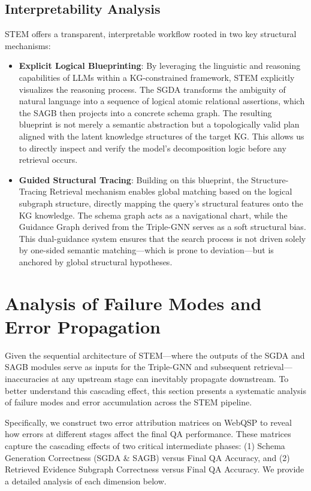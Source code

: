\documentclass[11pt]{article}
\begin{document}
\subsection{Interpretability Analysis}
STEM offers a transparent, interpretable workflow rooted in two key structural mechanisms:
\begin{itemize}
    \item \textbf{Explicit Logical Blueprinting}: By leveraging the linguistic and reasoning capabilities of LLMs within a KG-constrained framework, STEM explicitly visualizes the reasoning process. The SGDA transforms the ambiguity of natural language into a sequence of logical atomic relational assertions, which the SAGB then projects into a concrete schema graph. The resulting blueprint is not merely a semantic abstraction but a topologically valid plan aligned with the latent knowledge structures of the target KG. This allows us to directly inspect and verify the model's decomposition logic before any retrieval occurs. 
    \item \textbf{Guided Structural Tracing}: Building on this blueprint, the Structure-Tracing Retrieval mechanism enables global matching based on the logical subgraph structure, directly mapping the query's structural features onto the KG knowledge. The schema graph acts as a navigational chart, while the Guidance Graph derived from the Triple-GNN serves as a soft structural bias. This dual-guidance system ensures that the search process is not driven solely by one-sided semantic matching—which is prone to deviation—but is anchored by global structural hypotheses. 
\end{itemize}

\section{Analysis of Failure Modes and Error Propagation}
\label{sec:afmep}

Given the sequential architecture of STEM—where the outputs of the SGDA and SAGB modules serve as inputs for the Triple-GNN and subsequent retrieval—inaccuracies at any upstream stage can inevitably propagate downstream. To better understand this cascading effect, this section presents a systematic analysis of failure modes and error accumulation across the STEM pipeline. 

Specifically, we construct two error attribution matrices on WebQSP to reveal how errors at different stages affect the final QA performance. These matrices capture the cascading effects of two critical intermediate phases: (1) Schema Generation Correctness (SGDA \& SAGB) versus Final QA Accuracy, and (2) Retrieved Evidence Subgraph Correctness versus Final QA Accuracy. We provide a detailed analysis of each dimension below.
\end{document}
